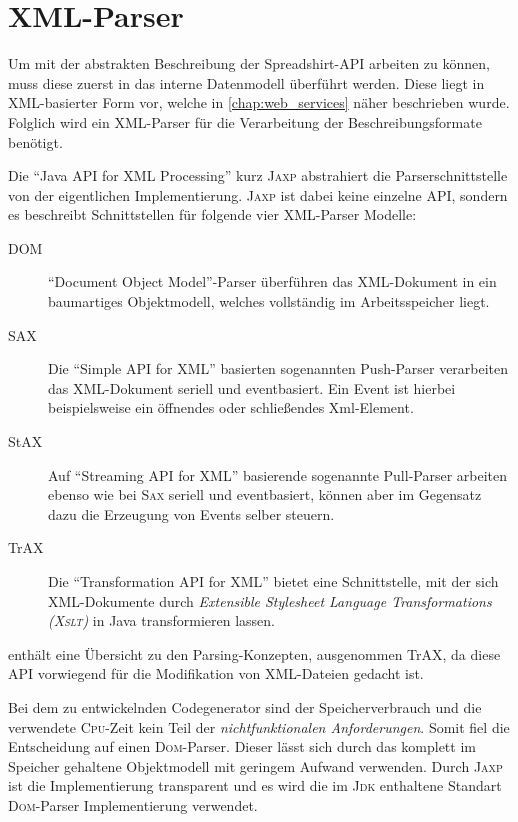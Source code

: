 \section{XML-Parser}
\label{sec:xml_parser}

Um mit der abstrakten Beschreibung der Spreadshirt-\gls{API} arbeiten zu können, muss diese zuerst in das interne Datenmodell überführt werden. Diese liegt in \gls{XML}-basierter Form vor, welche in \cref{chap:web_services} näher beschrieben wurde. Folglich wird ein \gls{XML}-Parser für die Verarbeitung der Beschreibungsformate benötigt.  

Die \enquote{Java \gls{API} for \gls{XML} Processing} kurz \textsc{Jaxp} abstrahiert die Parserschnittstelle von der eigentlichen Implementierung. \textsc{Jaxp} ist dabei keine einzelne \gls{API}, sondern es beschreibt Schnittstellen für folgende vier \gls{XML}-Parser Modelle:

\begin{description}
    \item[DOM] \enquote{Document Object Model}-Parser überführen das \gls{XML}-Dokument in ein baumartiges Objektmodell, welches vollständig im Arbeitsspeicher liegt.
    \item[SAX] Die \enquote{Simple \gls{API} for \gls{XML}} basierten sogenannten Push-Parser verarbeiten das \gls{XML}-Dokument seriell und eventbasiert. Ein Event ist hierbei beispielsweise ein öffnendes oder schließendes Xml-Element.
    \item[StAX] Auf \enquote{Streaming \gls{API} for \gls{XML}} basierende sogenannte Pull-Parser arbeiten ebenso wie bei \textsc{Sax} seriell und eventbasiert, können aber im Gegensatz dazu die Erzeugung von Events selber steuern. 
    \item[TrAX] Die \enquote{Transformation \gls{API} for \gls{XML}} bietet eine Schnittstelle, mit der sich \gls{XML}-Dokumente durch \emph{Extensible Stylesheet Language Transformations (\textsc{Xslt})} in Java transformieren lassen.
\end{description}

 enthält eine Übersicht zu den Parsing-Konzepten, ausgenommen TrAX, da diese \gls{API} vorwiegend für die Modifikation von \gls{XML}-Dateien gedacht ist.

Bei dem zu entwickelnden Codegenerator sind der Speicherverbrauch und die verwendete \textsc{Cpu}-Zeit kein Teil der \emph{nichtfunktionalen Anforderungen}. Somit fiel die Entscheidung auf einen \textsc{Dom}-Parser. Dieser lässt sich durch das komplett im Speicher gehaltene Objektmodell mit geringem Aufwand verwenden. Durch \textsc{Jaxp} ist die Implementierung transparent und es wird die im \textsc{Jdk} enthaltene Standart \textsc{Dom}-Parser Implementierung verwendet.

